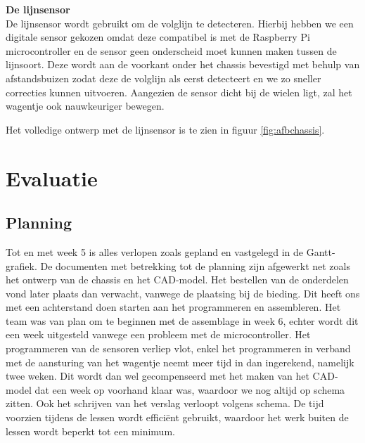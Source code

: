 \documentclass[a4paper,kulak]{kulakarticle}
\begin{document}
\textbf{\large De lijnsensor} \\
De lijnsensor wordt gebruikt om de volglijn te detecteren. Hierbij hebben we een digitale sensor gekozen omdat deze compatibel is met de Raspberry Pi microcontroller en de sensor geen onderscheid moet kunnen maken tussen de lijnsoort. Deze wordt aan de voorkant onder het chassis bevestigd met behulp van afstandsbuizen zodat deze de volglijn als eerst detecteert en we zo sneller correcties kunnen uitvoeren. Aangezien de sensor dicht bij de wielen ligt, zal het wagentje ook nauwkeuriger bewegen.

Het volledige ontwerp met de lijnsensor is te zien in figuur \ref{fig:afbchassis}.


	
\section{Evaluatie}

\subsection{Planning}
Tot en met week 5 is alles verlopen zoals gepland en vastgelegd in de Gantt-grafiek. De documenten met betrekking tot de planning zijn afgewerkt net zoals het ontwerp van de chassis en het CAD-model. Het bestellen van de onderdelen vond later plaats dan verwacht, vanwege de plaatsing bij de bieding. Dit heeft ons met een achterstand doen starten aan het programmeren en assembleren. Het team was van plan om te beginnen met de assemblage in week 6, echter wordt dit een week uitgesteld vanwege een probleem met de microcontroller. Het programmeren van de sensoren verliep vlot, enkel het programmeren in verband met de aansturing van het wagentje neemt meer tijd in dan ingerekend, namelijk twee weken. Dit wordt dan wel gecompenseerd met het maken van het CAD-model dat een week op voorhand klaar was, waardoor we nog altijd op schema zitten. Ook het schrijven van het verslag verloopt volgens schema. De tijd voorzien tijdens de lessen wordt efficiënt gebruikt, waardoor het werk buiten de lessen wordt beperkt tot een minimum.
\end{document}
